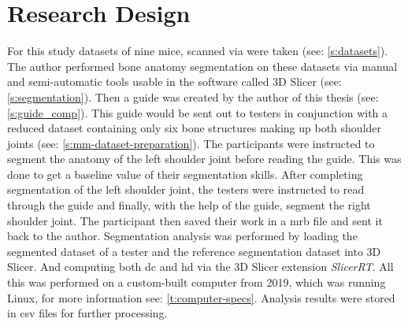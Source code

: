 \section{Research Design}\label{s:researchDesign}
For this study datasets of nine mice, scanned via \mct\space were taken (see: \cref{s:datasets}).
The author performed bone anatomy segmentation on these datasets via manual and semi-automatic tools usable in the software called 3D Slicer (see: \cref{s:segmentation}).
Then a guide was created by the author of this thesis (see: \cref{s:guide_comp}).
This guide would be sent out to testers in conjunction with a reduced dataset containing only six bone structures making up both shoulder joints (see: \cref{s:mm-dataset-preparation}).
The participants were instructed to segment the anatomy of the left shoulder joint before reading the guide.
This was done to get a baseline value of their segmentation skills.
After completing segmentation of the left shoulder joint, the testers were instructed to read through the guide and finally,
with the help of the guide, segment the right shoulder joint.
The participant then saved their work in a \acrfull{mrb} file and sent it back to the author.
Segmentation analysis was performed by loading the segmented dataset of a tester and the reference segmentation dataset into 3D Slicer.
And computing both \acrlong{dc} and \acrlong{hd} via the 3D Slicer extension \textit{SlicerRT}.
All this was performed on a custom-built computer from 2019,
which was running Linux, for more information see: \cref{t:computer-specs}.
Analysis results were stored in \acrfull{csv} files for further processing.


